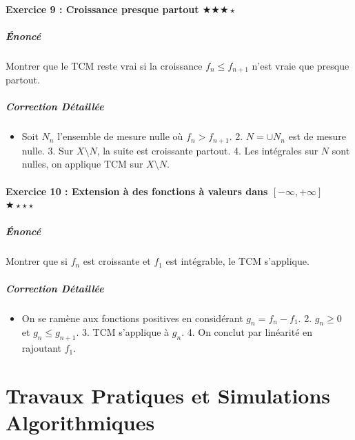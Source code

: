 \documentclass[11pt,a4paper]{article}
\begin{document}
\subsection*{Exercice 9 : Croissance presque partout \quad $\bigstar\bigstar\bigstar\star$}

\subsubsection*{Énoncé}
Montrer que le TCM reste vrai si la croissance $f_n \le f_{n+1}$ n'est vraie que presque partout.

\subsubsection*{Correction Détaillée}
\begin{itemize}
\item Soit $N_n$ l'ensemble de mesure nulle où $f_n > f_{n+1}$. 2. $N = \cup N_n$ est de mesure nulle. 3. Sur $X \setminus N$, la suite est croissante partout. 4. Les intégrales sur $N$ sont nulles, on applique TCM sur $X \setminus N$.
\end{itemize}

\subsection*{Exercice 10 : Extension à des fonctions à valeurs dans $[-\infty, +\infty]$ \quad $\bigstar\star\star\star$}

\subsubsection*{Énoncé}
Montrer que si $f_n$ est croissante et $f_1$ est intégrable, le TCM s'applique.

\subsubsection*{Correction Détaillée}
\begin{itemize}
\item On se ramène aux fonctions positives en considérant $g_n = f_n - f_1$. 2. $g_n \ge 0$ et $g_n \le g_{n+1}$. 3. TCM s'applique à $g_n$. 4. On conclut par linéarité en rajoutant $f_1$.
\end{itemize}

\part{Travaux Pratiques et Simulations Algorithmiques}
\end{document}
